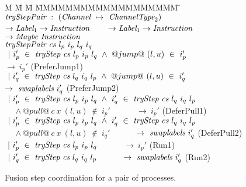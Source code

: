 
\newcommand\note[1]{\textcolor{notec}{(#1)}}

\begin{figure}
\begin{tabbing}
M \= M \= M \= MMMMMMMMMMMMMMMMMMM \= \kill
$\textit{tryStepPair} ~:~ (\textit{Channel} ~\mapsto~ \textit{ChannelType}_2)$ \\
\> \> $\to \textit{Label}_1 \to \textit{Instruction}$ ~~~
            $\to \textit{Label}_1 \to \textit{Instruction}$ \\
\> \> $\to \textit{Maybe}~\textit{Instruction}$ \\
$\textit{tryStepPair} ~\textit{cs}~l_p~i_p~l_q~i_q$ \\

\> $~|~i_p'~\in~\textit{tryStep}~\textit{cs}~l_p~i_p~l_q ~\wedge~@jump@~(l,u)~\in~i_p'$ \\
\> $\to~i_p'$
\> \> \> \note{PreferJump1} 
\\[0.5ex]

\> $~|~i_q'~\in~\textit{tryStep}~\textit{cs}~l_q~i_q~l_p ~\wedge~@jump@~(l,u)~\in~i_q'$ \\
\> $\to~\textit{swaplabels}~i_q'$ 
\> \> \> \note{PreferJump2}
\\[0.5ex]

\> $~|~i_p'~\in~\textit{tryStep}~\textit{cs}~l_p~i_p~l_q ~\wedge~ i_q'~\in~\textit{tryStep}~\textit{cs}~l_q~i_q~l_p$ \\
\> ~~ $\wedge~@pull@~c~x~(l,u)~\not\in~i_p'$ 
   ~~~~~ $\to~i_p'$ 
\> \> \> \note{DeferPull1} 
\\[0.5ex]

\> $~|~i_p'~\in~\textit{tryStep}~\textit{cs}~l_p~i_p~l_q ~\wedge~i_q'~\in~\textit{tryStep}~\textit{cs}~l_q~i_q~l_p$ \\
\> ~~ $\wedge~@pull@~c~x~(l,u)~\not\in~i_q'$ 
   ~~~~~ $\to~\textit{swaplabels}~i_q'$ 
\> \> \> \note{DeferPull2} 
\\[0.5ex]

\> $~|~i_p'~\in~\textit{tryStep}~\textit{cs}~l_p~i_p~l_q$ ~~~~~ $\to~i_p'$ 
\> \> \> \note{Run1} 
\\[0.5ex]

\> $~|~i_q'~\in~\textit{tryStep}~\textit{cs}~l_q~i_q~l_p$ ~~~~~ $\to~\textit{swaplabels}~i_q'$
\> \> \> \note{Run2} \\


\end{tabbing}
\caption{Fusion step coordination for a pair of processes.}
\label{fig:Fusion:Def:StepPair}
\end{figure}

